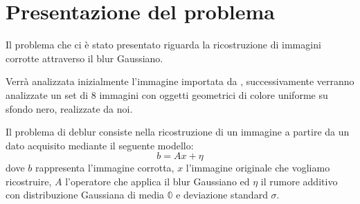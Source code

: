 \section{Presentazione del problema}

Il problema che ci è stato presentato riguarda la ricostruzione di 
immagini corrotte attraverso il blur Gaussiano.

Verrà analizzata inizialmente l'immagine  importata da
, successivamente verranno analizzate un set di 8 immagini con oggetti geometrici di colore uniforme su sfondo nero, realizzate da noi.

Il problema di deblur consiste nella ricostruzione di un immagine a partire da un dato acquisito mediante il seguente modello:
\[b=Ax+\eta\]
dove $b$ rappresenta l'immagine corrotta, $x$ l'immagine originale che vogliamo ricostruire, $A$ l'operatore che applica il blur Gaussiano ed $\eta$ il rumore additivo con distribuzione Gaussiana di  media $\mathbb{0}$ e deviazione standard $\sigma$.
